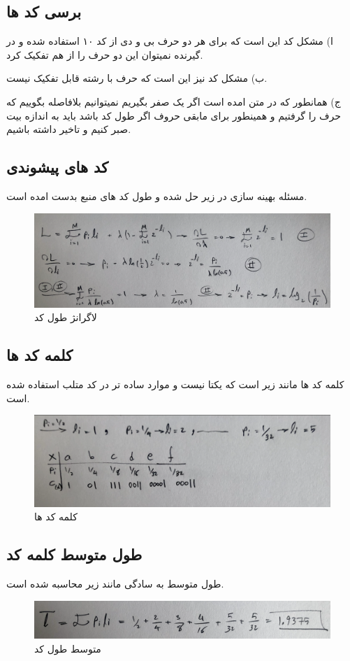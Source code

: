 \documentclass[10pt]{article}
\begin{document}
	 \subsection{برسی کد ها}
	 \par
	ا) مشکل کد 
	 این است که برای هر دو حرف بی و دی از کد ۱۰ استفاده شده و در گیرنده نمیتوان این دو حرف را از هم تفکیک کرد.
	 
	 \par
	 \noindent
	 ب) مشکل کد 
	نیز این است که حرف 
	 با رشته 
	 قابل تفکیک نیست.
	 \par
	 \noindent
	 ج) همانطور که در متن امده است اگر یک صفر بگیریم نمیتوانیم بلافاصله بگوییم که حرف 
	 را گرفتیم و همینطور برای مابقی حروف اگر طول کد 
	 باشد باید به اندازه 
	 بیت صبر کنیم و تاخیر داشته باشیم.
	 
	 \subsection{کد های پیشوندی}
	 مسئله بهینه سازی در زیر حل شده و طول کد های منبع بدست امده است.
	 
	 \begin{figure}[H]
	 	\centering
	 	\includegraphics[width=0.9\linewidth]{../img/5.2}
	 	\caption{لاگرانژ طول کد}
	 	\label{fig:5-2}
	 \end{figure}
 
 	\subsection{کلمه کد ها}
 	کلمه کد ها مانند زیر است که یکتا نیست و موارد ساده تر در کد متلب استفاده شده است.
 	 \begin{figure}[H]
 		\centering
 		\includegraphics[width=0.9\linewidth]{../img/5.3}
 		\caption{کلمه کد ها}
 		\label{fig:5-3}
 	\end{figure}
 	
 	\subsection{طول متوسط کلمه کد}
 	طول متوسط به سادگی مانند زیر محاسبه شده است.
 	\begin{figure}[H]
 		\centering
 		\includegraphics[width=0.9\linewidth]{../img/5.4}
 		\caption{متوسط طول کد}
 		\label{fig:5-4}
 	\end{figure}
 
 
\end{document}
